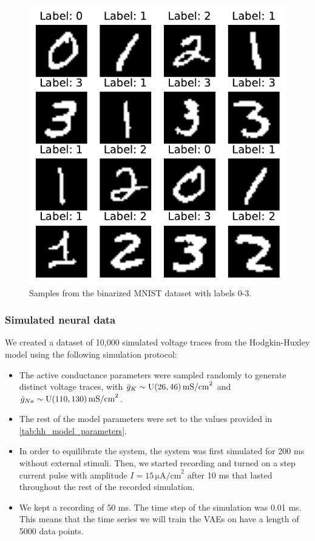 \begin{figure}[!htb]
\begin{center}\includegraphics[scale=0.7]{latex/figures/bmnist.pdf}
\end{center}
\caption{Samples from the binarized MNIST dataset with labels 0-3.}
\label{fig:bmnist}
\end{figure}

\subsubsection{Simulated neural data}

We created a dataset of 10,000 simulated voltage traces from the Hodgkin-Huxley model using the following simulation protocol:

\begin{itemize}
    \item The active conductance parameters were sampled randomly to generate distinct voltage traces, with $\bar{g}_K \sim \mathrm{U} \qty(26, 46) \, \mathrm{mS/cm}^2$ and $\bar{g}_{Na} \sim \mathrm{U} \qty(110, 130) \,\mathrm{mS/cm}^2$.
    \item The rest of the model parameters were set to the values provided in \autoref{tab:hh_model_parameters}.
    \item In order to equilibrate the system, the system was first simulated for 200 ms without external stimuli. Then, we started recording and turned on a step current pulse with amplitude $I = 15 \, \mathrm{\mu A/cm}^2$ after 10 ms that lasted throughout the rest of the recorded simulation.
    \item We kept a recording of 50 ms. The time step of the simulation was 0.01 ms. This means that the time series we will train the VAEs on have a length of 5000 data points.
\end{itemize}

